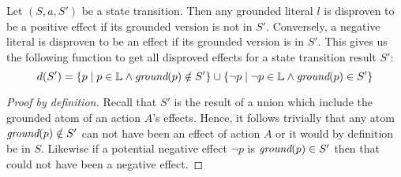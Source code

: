 \documentclass[../Master.tex]{subfiles}
\begin{document}
\begin{theorem}\label{thm:nca:disprove-effects}
	 Let $\left(S, a, S'\right)$ be a state transition. Then any grounded literal $l$ is disproven to be a positive effect if its grounded version is not in $S'$. Conversely, a negative literal is disproven to be an effect if its grounded version is in $S'$. This gives us the following function to get all disproved effects for a state transition result $S'$:	
	\begin{equation*}
		 d(S') = \left\{
			p \mid p \in \mathbb{L} \land \textit{ground} (p) \notin S'
			\right\} 
			\cup
			 \left\{
			\neg p \mid \neg p \in \mathbb{L} \land \textit{ground}(p) \in S'
			\right\}
	\end{equation*}
\end{theorem}
	\begin{proof}[Proof by definition]
		Recall that $S'$ is the result of a union which include the grounded atom of an action $A$'s effects. Hence, it follows trivially that any atom $\textit{ground}(p) \notin S'$ can not have been an effect of action $A$ or it would by definition be in $S$.
	Likewise if a potential negative effect $\neg p$ is $\textit{ground}(p) \in S'$ then that could not have been a negative effect.
	\end{proof}
\end{document}
